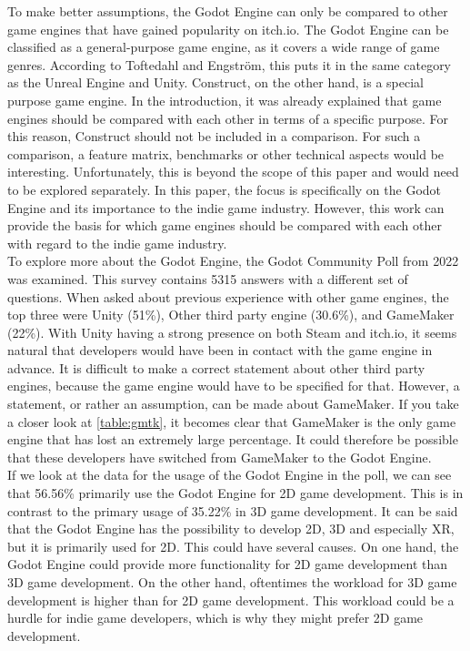 To make better assumptions, the Godot Engine can only be compared to other game engines that have gained popularity on itch.io.
The Godot Engine can be classified as a general-purpose game engine, as it covers a wide range of game genres.
According to Toftedahl and Engström, this puts it in the same category as the Unreal Engine and Unity.
Construct, on the other hand, is a special purpose game engine.
In the introduction, it was already explained that game engines should be compared with each other in terms of a specific purpose.
For this reason, Construct should not be included in a comparison.
For such a comparison, a feature matrix, benchmarks or other technical aspects would be interesting.
Unfortunately, this is beyond the scope of this paper and would need to be explored separately.
In this paper, the focus is specifically on the Godot Engine and its importance to the indie game industry.
However, this work can provide the basis for which game engines should be compared with each other with regard to the indie game industry.\\

To explore more about the Godot Engine, the Godot Community Poll from 2022 was examined\cite{godot-poll-results}.
This survey contains 5315 answers with a different set of questions.
When asked about previous experience with other game engines, the top three were Unity (51\%), Other third party engine (30.6\%), and GameMaker (22\%).
With Unity having a strong presence on both Steam and itch.io, it seems natural that developers would have been in contact with the game engine in advance.
It is difficult to make a correct statement about other third party engines, because the game engine would have to be specified for that.
However, a statement, or rather an assumption, can be made about GameMaker.
If you take a closer look at \autoref{table:gmtk}, it becomes clear that GameMaker is the only game engine that has lost an extremely large percentage.
It could therefore be possible that these developers have switched from GameMaker to the Godot Engine.\\

If we look at the data for the usage of the Godot Engine in the poll, we can see that 56.56\% primarily use the Godot Engine for 2D game development.
This is in contrast to the primary usage of 35.22\% in 3D game development.
It can be said that the Godot Engine has the possibility to develop 2D, 3D and especially XR, but it is primarily used for 2D.
This could have several causes.
On one hand, the Godot Engine could provide more functionality for 2D game development than 3D game development.
On the other hand, oftentimes the workload for 3D game development is higher than for 2D game development.
This workload could be a hurdle for indie game developers, which is why they might prefer 2D game development.\\

